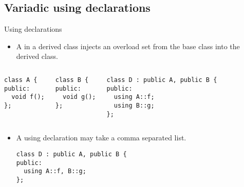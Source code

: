 \subsection{Variadic using declarations}

\begin{frame}[t,fragile]{Using declarations}
\begin{itemize}
  \item A  in a derived class 
        injects an overload set from the base class into the derived class.
\end{itemize}

\begin{columns}[T]
\begin{lstlisting}
class A {
public:
  void f();
};
\end{lstlisting}

\begin{lstlisting}
class B {
public:
  void g();
};
\end{lstlisting}

\begin{lstlisting}
class D : public A, public B {
public:
  using A::f;
  using B::g;
};
\end{lstlisting}

\end{columns}

\begin{itemize}
  \item A using declaration may take a comma separated list.
\begin{lstlisting}
class D : public A, public B {
public:
  using A::f, B::g;
};
\end{lstlisting}
\end{itemize}
\end{frame}

